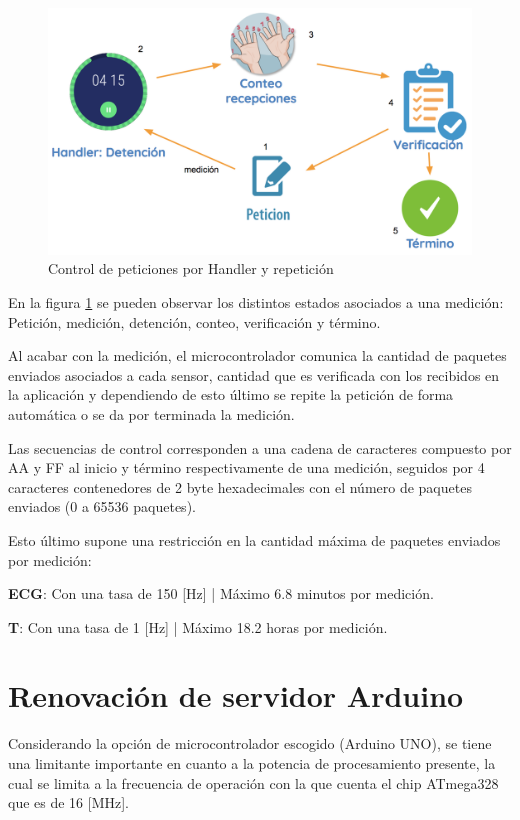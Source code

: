 \begin{figure}[H]
	\centering
	\includegraphics[scale=0.5]{figuras/proto2/handler.png}
	\caption{Control de peticiones por Handler y repetición}
	\label{handler}
\end{figure}

En la figura \ref{handler} se pueden observar los distintos estados asociados a una medición: Petición, medición, detención, conteo, verificación y término.

Al acabar con la medición, el microcontrolador comunica la cantidad de paquetes enviados asociados a cada sensor, cantidad que es verificada con los recibidos en la aplicación y dependiendo de esto último se repite la petición de forma automática o se da por terminada la medición. \newpage

Las secuencias de control corresponden a una cadena de caracteres compuesto por AA y FF al inicio y término respectivamente de una medición, seguidos por 4 caracteres contenedores de 2 byte hexadecimales con el número de paquetes enviados (0 a 65536 paquetes).

Esto último supone una restricción en la cantidad máxima de paquetes enviados por medición:

\textbf{ECG}: Con una tasa de 150 [Hz] | Máximo 6.8 minutos por medición.

\textbf{T}: Con una tasa de 1 [Hz] | Máximo 18.2 horas por medición.

\section{Renovación de servidor Arduino}

Considerando la opción de microcontrolador escogido (Arduino UNO), se tiene una limitante importante en cuanto a la potencia de procesamiento presente, la cual se limita a la frecuencia de operación con la que cuenta el chip ATmega328 que es de 16 [MHz]. 

